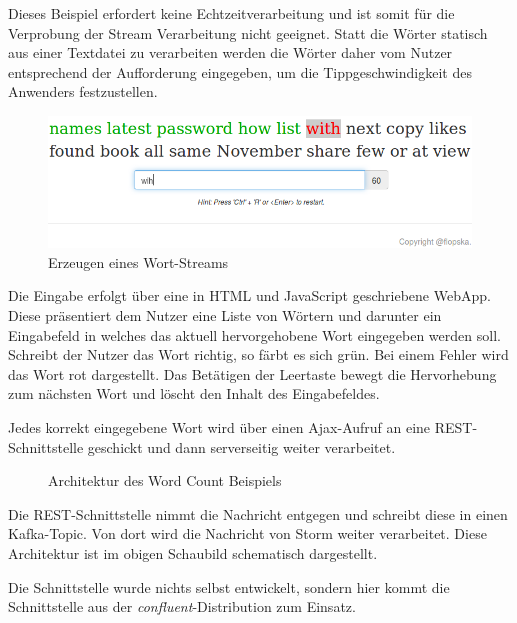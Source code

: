\documentclass[a4paper,11pt]{scrartcl}
\begin{document}
  Dieses Beispiel erfordert keine Echtzeitverarbeitung und ist somit
  für die Verprobung der Stream Verarbeitung nicht geeignet. Statt die
  Wörter statisch aus einer Textdatei zu verarbeiten werden die Wörter
  daher vom Nutzer entsprechend der Aufforderung eingegeben, um die
  Tippgeschwindigkeit des Anwenders festzustellen.

  \begin{figure}[!h]
    \centering
    \includegraphics[scale=0.4,natwidth=750,natheight=234]{../presentation/img/webapp.png}
    \caption{Erzeugen eines Wort-Streams\protect\footnotemark}
  \end{figure}


  Die Eingabe erfolgt über eine in HTML und JavaScript geschriebene
  WebApp. Diese präsentiert dem Nutzer eine Liste von Wörtern und
  darunter ein Eingabefeld in welches das aktuell hervorgehobene Wort
  eingegeben werden soll. Schreibt der Nutzer das Wort richtig, so
  färbt es sich grün. Bei einem Fehler wird das Wort rot dargestellt.
  Das Betätigen der Leertaste bewegt die Hervorhebung zum nächsten
  Wort und löscht den Inhalt des Eingabefeldes.

  Jedes korrekt eingegebene Wort wird über einen Ajax-Aufruf an eine
  REST-Schnittstelle geschickt und dann serverseitig weiter
  verarbeitet.

  \begin{figure}[!h]
    \center
    \scalebox{.7}{}
    \caption{Architektur des Word Count Beispiels}
    \label{fig:wordcountsamplearchitecture}
  \end{figure}

  Die REST-Schnittstelle nimmt die Nachricht entgegen und schreibt
  diese in einen Kafka-Topic. Von dort wird die Nachricht von Storm
  weiter verarbeitet. Diese Architektur ist im obigen Schaubild
  schematisch dargestellt.

  Die Schnittstelle wurde nichts selbst entwickelt, sondern hier kommt
  die Schnittstelle aus der \textit{confluent}-Distribution zum
  Einsatz.
\end{document}
